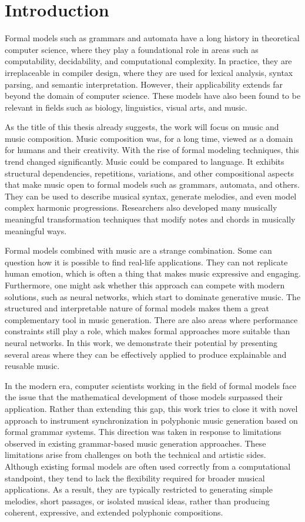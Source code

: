 \chapter{Introduction}
Formal models such as grammars and automata have a long history in theoretical computer science, where they play a foundational role in areas such as computability, decidability, and computational complexity. In practice, they are irreplaceable in compiler design, where they are used for lexical analysis, syntax parsing, and semantic interpretation. However, their applicability extends far beyond the domain of computer science. These models have also been found to be relevant in fields such as biology, linguistics, visual arts, and music.

As the title of this thesis already suggests, the work will focus on music and music composition. Music composition was, for a long time, viewed as a domain for humans and their creativity. With the rise of formal modeling techniques, this trend changed significantly. Music could be compared to language. It exhibits structural dependencies, repetitions, variations, and other compositional aspects that make music open to formal models such as grammars, automata, and others. They can be used to describe musical syntax, generate melodies, and even model complex harmonic progressions. Researchers also developed many musically meaningful transformation techniques that modify notes and chords in musically meaningful ways.

Formal models combined with music are a strange combination. Some can question how it is possible to find real-life applications. They can not replicate human emotion, which is often a thing that makes music expressive and engaging. Furthermore, one might ask whether this approach can compete with modern solutions, such as neural networks, which start to dominate generative music. The structured and interpretable nature of formal models makes them a great complementary tool in music generation. There are also areas where performance constraints still play a role, which makes formal approaches more suitable than neural networks. In this work, we demonstrate their potential by presenting several areas where they can be effectively applied to produce explainable and reusable music.

In the modern era, computer scientists working in the field of formal models face the issue that the mathematical development of those models surpassed their application. Rather than extending this gap, this work tries to close it with novel approach to instrument synchronization in polyphonic music generation based on formal grammar systems. This direction was taken in response to limitations observed in existing grammar-based music generation approaches. These limitations arise from challenges on both the technical and artistic sides. Although existing formal models are often used correctly from a computational standpoint, they tend to lack the flexibility required for broader musical applications. As a result, they are typically restricted to generating simple melodies, short passages, or isolated musical ideas, rather than producing coherent, expressive, and extended polyphonic compositions.

